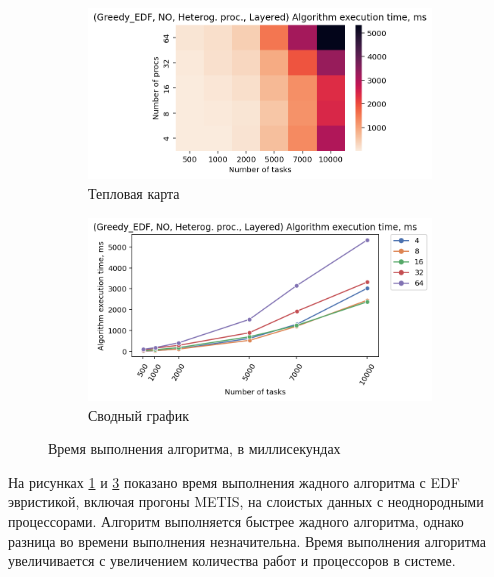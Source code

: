 \begin{figure}[!htbp]
    \centering
    \begin{subfigure}{0.49\textwidth}
        \includegraphics[width=\textwidth]{imgs/unbalanced/NO_EDF/et_heatmap.png}
        \caption{Тепловая карта}
        \label{fig:NO-unbalanced-EDF-exec-time-heatmap}
    \end{subfigure}
    \hfill
    \begin{subfigure}{0.49\textwidth}
        \includegraphics[width=\textwidth]{imgs/unbalanced/NO_EDF/tr_graph.png}
        \caption{Сводный график}
        \label{fig:NO-unbalanced-EDF-exec-time-compiled}
    \end{subfigure}
    \caption{Время выполнения алгоритма, в миллисекундах}
\end{figure}

На рисунках \ref{fig:NO-unbalanced-EDF-exec-time-heatmap} и \ref{fig:NO-unbalanced-EDF-exec-time-compiled} показано время выполнения жадного алгоритма с EDF эвристикой, включая прогоны METIS, на слоистых данных с неоднородными процессорами. Алгоритм выполняется быстрее жадного алгоритма, однако разница во времени выполнения незначительна. Время выполнения алгоритма увеличивается с увеличением количества работ и процессоров в системе.